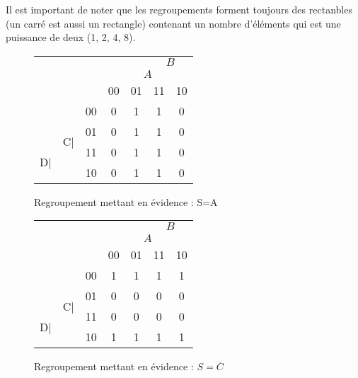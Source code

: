 \documentclass[a4paper,11pt]{book}
\theoremstyle{definition}
\theoremstyle{definition}
\begin{document}
Il est important de noter que les regroupements forment toujours des rectanbles (un carré est aussi un rectangle) contenant un nombre d'éléments qui est une puissance de deux (1, 2, 4, 8).

\begin{figure}
  \centering
  \begin{tabular}{|ccc|c|c|c|c|}
    \hline
         & & & \multicolumn{2}{c}{} & \multicolumn{2}{c|}{\underline{$\:\:\:B\:\:\:$}} \\
         & & & \multicolumn{1}{c}{}& \multicolumn{2}{c}{\underline{$\:\:\:A\:\:\:$}} & \\
         & & &  00 & 01 & 11 & 10 \\
    \hline 
         & & 00 & 0 & \cellcolor{blue!25}1 & \cellcolor{blue!25}1 & 0\\
    \cline{3-7}
         & \multirow{2}{1em}{C|} & 01 & 0 & \cellcolor{blue!25}1 & \cellcolor{blue!25}1 & 0\\
    \cline{3-7}
         \multirow{2}{1em}{D|} & & 11 & 0 & \cellcolor{blue!25}1 & \cellcolor{blue!25}1 & 0\\
    \cline{3-7}
         & & 10 & 0 & \cellcolor{blue!25}1 & \cellcolor{blue!25}1 & 0\\
    \hline
  \end{tabular}
  \caption{Regroupement mettant en évidence : S=A}
  \label{tab:karnaughEx1}
\end{figure}

\begin{figure}
  \centering
  \begin{tabular}{|ccc|c|c|c|c|}
    \hline
         & & & \multicolumn{2}{c}{} & \multicolumn{2}{c|}{\underline{$\:\:\:B\:\:\:$}} \\
         & & & \multicolumn{1}{c}{}& \multicolumn{2}{c}{\underline{$\:\:\:A\:\:\:$}} & \\
         & & &  00 & 01 & 11 & 10 \\
    \hline 
         & & 00 & \cellcolor{blue!25}1 & \cellcolor{blue!25}1 & \cellcolor{blue!25}1 & \cellcolor{blue!25}1\\
    \cline{3-7}
         & \multirow{2}{1em}{C|} & 01 & 0 & 0 & 0 & 0\\
    \cline{3-7}
         \multirow{2}{1em}{D|} & & 11 & 0 & 0 & 0 & 0\\
    \cline{3-7}
         & & 10 & \cellcolor{blue!25}1 & \cellcolor{blue!25}1 & \cellcolor{blue!25}1 & \cellcolor{blue!25}1\\
    \hline
  \end{tabular}
  \caption{Regroupement mettant en évidence : $S=\overline{C}$}
  \label{tab:karnaughEx2}
\end{figure}
\end{document}
